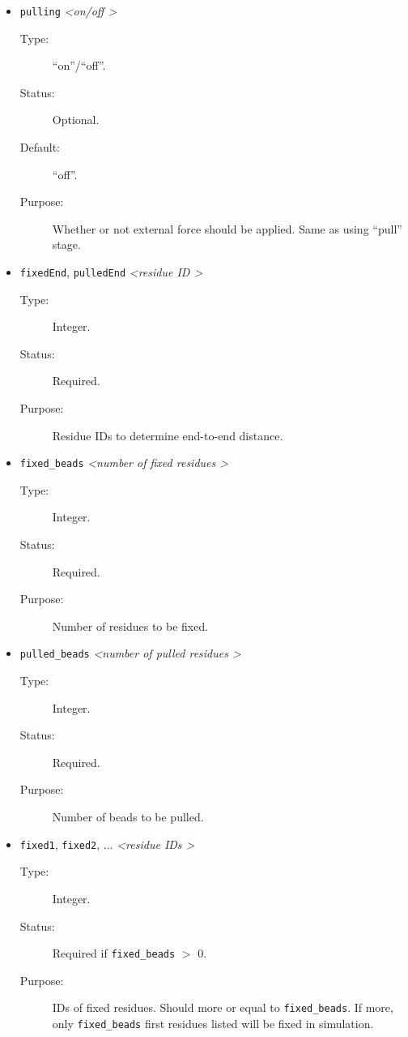 \documentclass[a4paper]{article}
\begin{document}
\begin{itemize}

\item \texttt{pulling} \textit{\textless on/off \textgreater}
\begin{description}
\item[Type:] ``on''/``off''.
\item[Status:] Optional.
\item[Default:] ``off''.
\item[Purpose:] Whether or not external force should be applied. Same as using ``pull'' stage.
\end{description}

\item \texttt{fixedEnd}, \texttt{pulledEnd} \textit{\textless residue ID \textgreater}
\begin{description}
\item[Type:] Integer.
\item[Status:] Required.
\item[Purpose:] Residue IDs to determine end-to-end distance.
\end{description}

\item \texttt{fixed\_beads} \textit{\textless number of fixed residues \textgreater}
\begin{description}
\item[Type:] Integer.
\item[Status:] Required.
\item[Purpose:] Number of residues to be fixed.
\end{description}

\item \texttt{pulled\_beads} \textit{\textless number of pulled residues \textgreater}
\begin{description}
\item[Type:] Integer.
\item[Status:] Required.
\item[Purpose:] Number of beads to be pulled.
\end{description}

\item \texttt{fixed1}, \texttt{fixed2}, $\ldots$ \textit{\textless residue IDs \textgreater}
\begin{description}
\item[Type:] Integer.
\item[Status:] Required if \texttt{fixed\_beads} $>$ $0$.
\item[Purpose:] IDs of fixed residues. Should more or equal to \texttt{fixed\_beads}. If more, only \texttt{fixed\_beads} first residues listed will be fixed in simulation.
\end{description}


\end{itemize}
\end{document}
